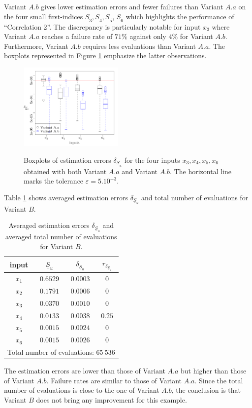 Variant $A.b$ gives lower estimation errors and fewer failures than Variant $A.a$ on the four small first-indices $\underline{S}_3,\underline{S}_4,\underline{S}_5$, $\underline{S}_6$ which highlights the performance of ``Correlation 2''. The discrepancy is particularly notable for input $x_3$ where Variant $A.a$ reaches a failure rate of $71\%$ against only $4\%$ for Variant $A.b$. Furthermore, Variant $A.b$ requires less evaluations than Variant $A.a$. The boxplots represented in Figure \ref{boxplots.bratley} emphasize the latter observations.
\begin{figure}[!ht]
\caption{Boxplots of estimation errors $\delta_{\underline{S}_u}$ for the four inputs $x_3,x_4,x_5,x_6$ obtained with both Variant $A.a$ and Variant $A.b$. The horizontal line marks the tolerance $\varepsilon=5.10^{-3}$.}
\centering
\includegraphics[width=0.45\textwidth]{Images/boxplots_bis.pdf}
\label{boxplots.bratley}
\end{figure}

Table \ref{res.bratley.B} shows averaged estimation errors $\delta_{\underline{S}_u}$ and total number of evaluations for Variant $B$. 
\begin{table}[!ht]
\caption{Averaged estimation errors $\delta_{\underline{S}_u}$ and averaged total number of evaluations for Variant $B$.}
\centering
\begin{tabular}{cccc}
\hline
 input & $\underline{S}_u$ & $\delta_{\underline{S}_u}$ & $r_{\delta_{\underline{S}_u}}$ \\ \hline
 $x_1$ & $0.6529$ &  $0.0003$ & $0$ \\ \hline
 $x_2$ & $0.1791$ &  $0.0006$ & $0$ \\ \hline
 $x_3$ & $0.0370$ &  $0.0010$ & $0$ \\ \hline
 $x_4$ & $0.0133$ &  $0.0038$ & $0.25$    \\ \hline
 $x_5$ & $0.0015$ & $0.0024$ & $0$  \\ \hline
 $x_6$ & $0.0015$ & $0.0026$ & $0$  \\ \hline \hline
\multicolumn{4}{l}{Total number of evaluations: $65 \ 536$}\\ \hline 
\end{tabular}
\label{res.bratley.B}
\end{table}
The estimation errors are lower than those of Variant $A.a$ but higher than those of Variant $A.b$. Failure rates are similar to those of Variant $A.a$. Since the total number of evaluations is close to the one of Variant $A.b$, the conclusion is that Variant $B$ does not bring any improvement for this example.
\bigskip

